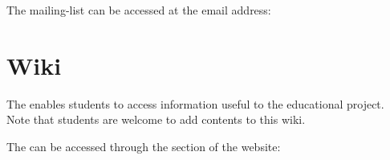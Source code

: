 The mailing-list can be accessed at the email address:

\begin{center}
\end{center}

%
%

\section{Wiki}

The  enables students to access information useful to the
 educational project. Note that students are welcome to add
contents to this wiki.

The   can be accessed through the  section
of the  website:

\begin{center}
\end{center}
